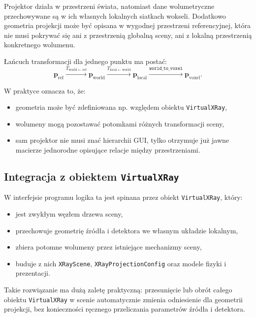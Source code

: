 \documentclass[12pt,a4paper]{article}
\begin{document}
Projektor działa w przestrzeni świata, natomiast dane wolumetryczne przechowywane są
w ich własnych lokalnych siatkach wokseli. Dodatkowo geometria projekcji może być
opisana w wygodnej przestrzeni referencyjnej, która nie musi pokrywać się ani
z przestrzenią globalną sceny, ani z lokalną przestrzenią konkretnego wolumenu.

Łańcuch transformacji dla jednego punktu ma postać:
\[
  \mathbf{p}_{\mathrm{ref}}
  \xrightarrow{T_{\mathrm{world}\leftarrow \mathrm{ref}}}
  \mathbf{p}_{\mathrm{world}}
  \xrightarrow{T_{\mathrm{local}\leftarrow \mathrm{world}}}
  \mathbf{p}_{\mathrm{local}}
  \xrightarrow{\texttt{world\_to\_voxel}}
  \mathbf{p}_{\mathrm{voxel}}.
\]

W praktyce oznacza to, że:
\begin{itemize}
  \item geometria może być zdefiniowana np. względem obiektu \texttt{VirtualXRay},
  \item wolumeny mogą pozostawać potomkami różnych transformacji sceny,
  \item sam projektor nie musi znać hierarchii GUI, tylko otrzymuje już jawne macierze
        jednorodne opisujące relacje między przestrzeniami.
\end{itemize}

\subsection{Integracja z obiektem \texttt{VirtualXRay}}

W interfejsie programu logika ta jest spinana przez obiekt \texttt{VirtualXRay},
który:
\begin{itemize}
  \item jest zwykłym węzłem drzewa sceny,
  \item przechowuje geometrię źródła i detektora we własnym układzie lokalnym,
  \item zbiera potomne wolumeny przez istniejące mechanizmy sceny,
  \item buduje z nich \texttt{XRayScene}, \texttt{XRayProjectionConfig}
        oraz modele fizyki i prezentacji.
\end{itemize}

Takie rozwiązanie ma dużą zaletę praktyczną: przesunięcie lub obrót całego obiektu
\texttt{VirtualXRay} w scenie automatycznie zmienia odniesienie dla geometrii projekcji,
bez konieczności ręcznego przeliczania parametrów źródła i detektora.
\end{document}
